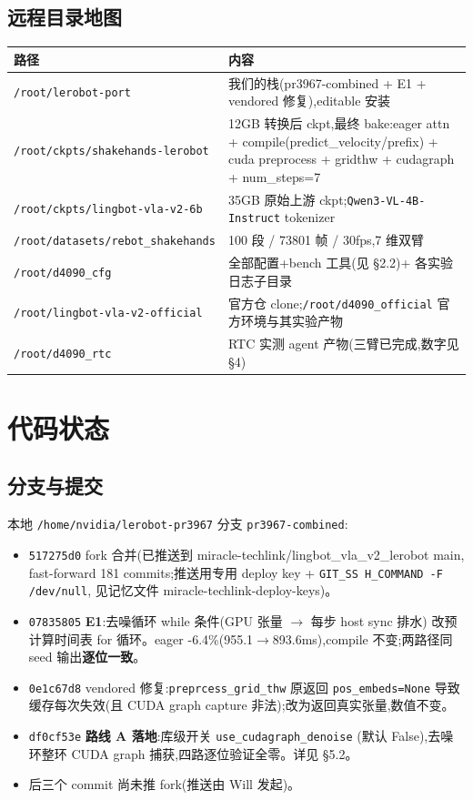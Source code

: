 \documentclass[11pt]{ctexart}
\begin{document}
\subsection{远程目录地图}
\begin{table}[htbp]
\centering\footnotesize
\begin{tabular}{@{}lp{9.6cm}@{}}
\toprule
路径 & 内容 \\
\midrule
\texttt{/root/lerobot-port} & 我们的栈(pr3967-combined + E1 + vendored 修复),editable 安装 \\
\texttt{/root/ckpts/shakehands-lerobot} & 12GB 转换后 ckpt,最终 bake:eager attn + compile(predict\_velocity/prefix) + cuda preprocess + gridthw + cudagraph + num\_steps=7 \\
\texttt{/root/ckpts/lingbot-vla-v2-6b} & 35GB 原始上游 ckpt;\texttt{Qwen3-VL-4B-Instruct} tokenizer \\
\texttt{/root/datasets/rebot\_shakehands} & 100 段 / 73801 帧 / 30fps,7 维双臂 \\
\texttt{/root/d4090\_cfg} & 全部配置+bench 工具(见 §2.2)+ 各实验日志子目录 \\
\texttt{/root/lingbot-vla-v2-official} & 官方仓 clone;\texttt{/root/d4090\_official} 官方环境与其实验产物 \\
\texttt{/root/d4090\_rtc} & RTC 实测 agent 产物(三臂已完成,数字见 §4) \\
\bottomrule
\end{tabular}
\end{table}

\section{代码状态}

\subsection{分支与提交}
本地 \texttt{/home/nvidia/lerobot-pr3967} 分支 \texttt{pr3967-combined}:
\begin{itemize}
\item \texttt{517275d0} fork 合并(已推送到 miracle-techlink/lingbot\_vla\_v2\_lerobot main,
fast-forward 181 commits;推送用专用 deploy key + \texttt{GIT\_SS H\_COMMAND -F /dev/null},
见记忆文件 miracle-techlink-deploy-keys)。
\item \texttt{07835805} \textbf{E1}:去噪循环 while 条件(GPU 张量 $\to$ 每步 host sync 排水)
改预计算时间表 for 循环。eager -6.4\%(955.1$\to$893.6ms),compile 不变;两路径同 seed
输出\textbf{逐位一致}。
\item \texttt{0e1c67d8} vendored 修复:\texttt{preprcess\_grid\_thw} 原返回 \texttt{pos\_embeds=None}
导致缓存每次失效(且 CUDA graph capture 非法);改为返回真实张量,数值不变。
\item \texttt{df0cf53e} \textbf{路线 A 落地}:库级开关 \texttt{use\_cudagraph\_denoise}
(默认 False),去噪环整环 CUDA graph 捕获,四路逐位验证全零。详见 §5.2。
\item 后三个 commit 尚未推 fork(推送由 Will 发起)。
\end{itemize}
\end{document}
